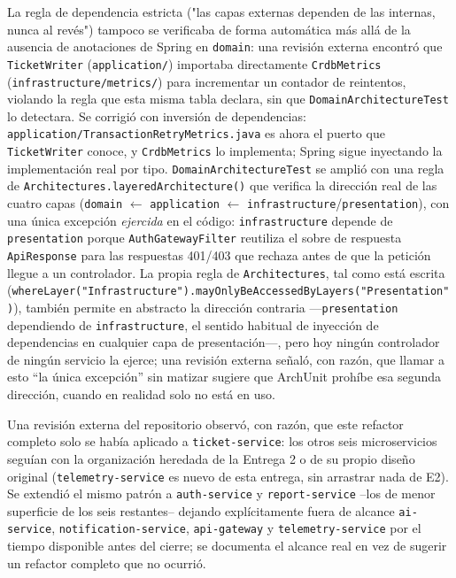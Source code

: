 La regla de dependencia estricta ("las capas externas dependen de las internas, nunca al
revés") tampoco se verificaba de forma automática más allá de la ausencia de anotaciones de
Spring en \texttt{domain}: una revisión externa encontró que \texttt{TicketWriter}
(\texttt{application/}) importaba directamente \texttt{CrdbMetrics}
(\texttt{infrastructure/metrics/}) para incrementar un contador de reintentos, violando la
regla que esta misma tabla declara, sin que \texttt{DomainArchitectureTest} lo detectara. Se
corrigió con inversión de dependencias: \texttt{application/TransactionRetryMetrics.java} es
ahora el puerto que \texttt{TicketWriter} conoce, y \texttt{CrdbMetrics} lo implementa; Spring
sigue inyectando la implementación real por tipo. \texttt{DomainArchitectureTest} se amplió con
una regla de \texttt{Architectures.layeredArchitecture()} que verifica la dirección real de las
cuatro capas (\texttt{domain} $\leftarrow$ \texttt{application} $\leftarrow$
\texttt{infrastructure}/\texttt{presentation}), con una única excepción \emph{ejercida} en el
código: \texttt{infrastructure} depende de \texttt{presentation} porque \texttt{AuthGatewayFilter}
reutiliza el sobre de respuesta \texttt{ApiResponse} para las respuestas 401/403 que rechaza antes
de que la petición llegue a un controlador. La propia regla de \texttt{Architectures}, tal como
está escrita (\texttt{whereLayer("Infrastructure").mayOnlyBeAccessedByLayers("Presentation")}),
también permite en abstracto la dirección contraria —\texttt{presentation} dependiendo de
\texttt{infrastructure}, el sentido habitual de inyección de dependencias en cualquier capa de
presentación—, pero hoy ningún controlador de ningún servicio la ejerce; una revisión externa
señaló, con razón, que llamar a esto ``la única excepción'' sin matizar sugiere que ArchUnit
prohíbe esa segunda dirección, cuando en realidad solo no está en uso.

Una revisión externa del repositorio observó, con razón, que este refactor completo solo se
había aplicado a \texttt{ticket-service}: los otros seis microservicios seguían con la
organización heredada de la Entrega 2 o de su propio diseño original (\texttt{telemetry-service}
es nuevo de esta entrega, sin arrastrar nada de E2). Se extendió el mismo patrón a
\texttt{auth-service} y \texttt{report-service} --los de menor superficie de los seis
restantes-- dejando explícitamente fuera de alcance \texttt{ai-service},
\texttt{notification-service}, \texttt{api-gateway} y \texttt{telemetry-service} por el tiempo
disponible antes del cierre; se documenta el alcance real en vez de sugerir un refactor completo
que no ocurrió.

